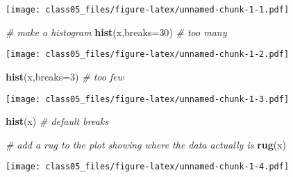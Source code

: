 \documentclass[]{article}
\newenvironment{Shaded}{\begin{snugshade}}{\end{snugshade}}
\newcommand{\CommentTok}[1]{\textcolor[rgb]{0.56,0.35,0.01}{\textit{#1}}}
\newcommand{\DataTypeTok}[1]{\textcolor[rgb]{0.13,0.29,0.53}{#1}}
\newcommand{\DecValTok}[1]{\textcolor[rgb]{0.00,0.00,0.81}{#1}}
\newcommand{\FloatTok}[1]{\textcolor[rgb]{0.00,0.00,0.81}{#1}}
\newcommand{\KeywordTok}[1]{\textcolor[rgb]{0.13,0.29,0.53}{\textbf{#1}}}
\newcommand{\NormalTok}[1]{#1}
\newcommand{\OperatorTok}[1]{\textcolor[rgb]{0.81,0.36,0.00}{\textbf{#1}}}
\newcommand{\OtherTok}[1]{\textcolor[rgb]{0.56,0.35,0.01}{#1}}
\newcommand{\StringTok}[1]{\textcolor[rgb]{0.31,0.60,0.02}{#1}}
\begin{document}
\texttt{[image: class05\_files/figure-latex/unnamed-chunk-1-1.pdf]}

\begin{Shaded}
\begin{Highlighting}[]
\CommentTok{# make a histogram}
\KeywordTok{hist}\NormalTok{(x,}\DataTypeTok{breaks=}\DecValTok{30}\NormalTok{) }\CommentTok{# too many}
\end{Highlighting}
\end{Shaded}

\texttt{[image: class05\_files/figure-latex/unnamed-chunk-1-2.pdf]}

\begin{Shaded}
\begin{Highlighting}[]
\KeywordTok{hist}\NormalTok{(x,}\DataTypeTok{breaks=}\DecValTok{3}\NormalTok{) }\CommentTok{# too few}
\end{Highlighting}
\end{Shaded}

\texttt{[image: class05\_files/figure-latex/unnamed-chunk-1-3.pdf]}

\begin{Shaded}
\begin{Highlighting}[]
\KeywordTok{hist}\NormalTok{(x) }\CommentTok{# default breaks }


\CommentTok{# add a rug to the plot showing where the data actually is}
\KeywordTok{rug}\NormalTok{(x)}
\end{Highlighting}
\end{Shaded}

\texttt{[image: class05\_files/figure-latex/unnamed-chunk-1-4.pdf]}

\begin{Shaded}
\end{Shaded}
\end{document}
